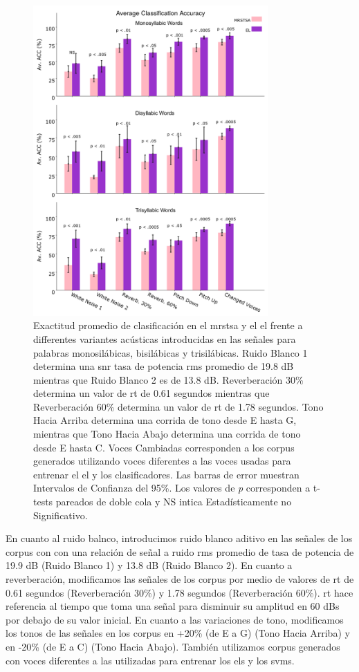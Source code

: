 \begin{figure}[h!]
    \centering
    \includegraphics[width=0.8\textwidth]{PLOT.png}
    \caption{Exactitud promedio de clasificación en el \gls{mrstsa} y el \gls{el} frente a differentes variantes acústicas introducidas en las señales para palabras monosilábicas, bisilábicas y trisilábicas.
	    Ruido Blanco 1 determina una \gls{snr} tasa de potencia \gls{rms} promedio de 19.8 dB mientras que Ruido Blanco 2 es de 13.8 dB.
	    Reverberación 30\% determina un valor de \gls{rt} de 0.61 segundos mientras que Reverberación 60\% determina un valor de \gls{rt} de 1.78 segundos.
	    Tono Hacia Arriba determina una corrida de tono desde E hasta G, mientras que Tono Hacia Abajo determina una corrida de tono desde E hasta C. Voces Cambiadas corresponden a los corpus generados utilizando voces diferentes a las voces usadas para entrenar el \gls{el} y los clasificadores. Las barras de error muestran Intervalos de Confianza del 95\%. Los valores de \emph{p} corresponden a t-tests pareados de doble cola y NS intica Estadísticamente no Significativo.}
    \label{fig:PLOT}
\end{figure}

En cuanto al ruido balnco, introducimos ruido blanco aditivo en las señales de los corpus con con una relación de señal a ruido \gls{rms} promedio de tasa de potencia de 19.9 dB (Ruido Blanco 1) y 13.8 dB (Ruido Blanco 2). En cuanto a reverberación, modificamos las señales de los corpus por medio de valores de \gls{rt} de 0.61 segundos (Reverberación 30\%) y 1.78 segundos (Reverberación 60\%). \gls{rt} hace referencia al tiempo que toma una señal para disminuir su amplitud en 60 dBs por debajo de su valor inicial. En cuanto a las variaciones de tono, modificamos los tonos de las señales en los corpus en +20\% (de E a G) (Tono Hacia Arriba) y en -20\% (de E a C) (Tono Hacia Abajo). También utilizamos corpus generados con voces diferentes a las utilizadas para entrenar los \glspl{el} y los \glspl{svm}.

